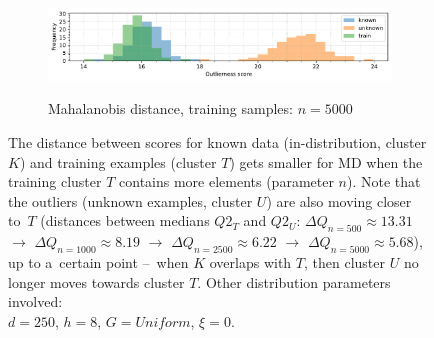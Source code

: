 \begin{figure}[t]
\begin{subfigure}[b]{\textwidth}
        \centering
        \caption{\small Mahalanobis distance, training samples: $n = 5000$}
        \includegraphics[width=\textwidth]{images/distributions/hists-md-samples/hist-distributions-dimension_250-samples_5000-distance_8-distribution_uniform-model_MD-seed_0.pdf}
        \label{fig:hists-md-5000}
    \end{subfigure}
    \caption{The distance between scores for known data (in-distribution, cluster $K$) and training examples (cluster $T$) gets smaller for MD when the training cluster $T$ contains more elements (parameter $n$). Note that the outliers (unknown examples, cluster $U$) are also moving closer to~$T$ (distances between medians $Q2_{T}$ and $Q2_{U}$: $\Delta{Q}_{n=500} \approx 13.31$ $\rightarrow$ $\Delta{Q}_{n=1000} \approx 8.19$ $\rightarrow$ $\Delta{Q}_{n=2500} \approx 6.22$ $\rightarrow$ $\Delta{Q}_{n=5000} \approx 5.68$), \\
    up to a~certain point –~when $K$ overlaps with $T$, then cluster $U$ no longer moves towards cluster $T$. Other distribution parameters involved: \\
    $d = 250$, $h = 8$, $G = \textit{Uniform}$, $\xi = 0$.}
    \label{fig:hists-md-samples}
\end{figure}

